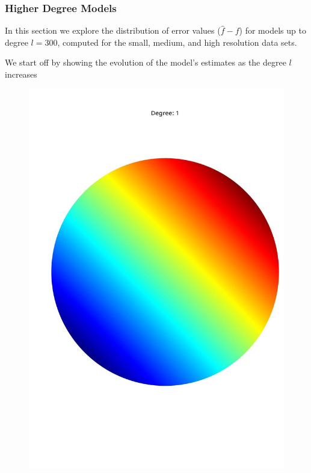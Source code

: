 \documentclass[a4paper]{article}
\theoremstyle{definition}
\begin{document}
\subsubsection{Higher Degree Models}
In this section we explore the distribution of error values ($\hat f - f$) for models up to degree $l = 300$, computed for the small, medium, and high resolution data sets.

We start off by showing the evolution of the model's estimates as the degree $l$ increases

\begin{figure}[h!]
    \begin{minipage}{.245\textwidth}
        \centering
        \includegraphics[width=0.95\linewidth]{media/med_1.jpg}
        \label{fig:med1}
    \end{minipage}
    \begin{minipage}{.245\textwidth}

\end{minipage}
\end{figure}
\end{document}
